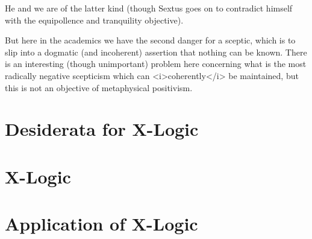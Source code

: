 \documentclass{rbjk}
\begin{document}
\begin{article}
He and we are of the latter kind (though Sextus goes on to contradict himself with the equipollence and tranquility objective).

But here in the academics we have the second danger for a sceptic, which is to slip into a dogmatic (and incoherent) assertion that nothing can be known.
There is an interesting (though unimportant) problem here concerning what is the most radically negative scepticism which can <i>coherently</i> be maintained, but this is not an objective of metaphysical positivism.




\section{Desiderata for X-Logic}

\section{X-Logic}

\section{Application of X-Logic}


%
%

\end{article}
\end{document}
